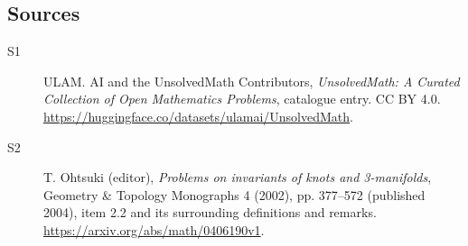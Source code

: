 \documentclass[11pt]{article}
\begin{document}
\subsection{Sources}
\begin{description}
\item[\hypertarget{source:statement:1}{S1}] ULAM. AI and the UnsolvedMath Contributors, \emph{UnsolvedMath: A Curated Collection of Open Mathematics Problems}, catalogue entry. CC BY 4.0. \url{https://huggingface.co/datasets/ulamai/UnsolvedMath}.
\item[\hypertarget{source:statement:2}{S2}] T. Ohtsuki (editor), \emph{Problems on invariants of knots and 3-manifolds}, Geometry \& Topology Monographs 4 (2002), pp. 377--572 (published 2004), item 2.2 and its surrounding definitions and remarks. \url{https://arxiv.org/abs/math/0406190v1}.
\end{description}
\label{end:statement}
\end{document}
